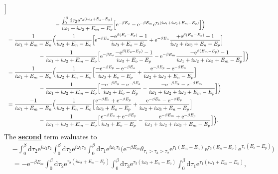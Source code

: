 \documentclass[12pt,a4paper]{scrartcl}
\numberwithin{equation}{section}
\renewcommand{\exp}[1]{\mathrm{e}^{#1}}
\begin{document}
\begin{align}
 \Big] \nonumber \\
 & \hspace*{3cm} -  \frac{\int_0^{\beta} \mathrm{d}\tau_3 \exp{\tau_3( i\omega_3 +E_o-E_p) }}{i\omega_1+ i\omega_2 + E_m-E_o}
 \Big[
 \exp{-\beta E_o} - \exp{-\beta E_m}\exp{\tau_3(i\omega_1+ i\omega_2 + E_m-E_o) }
 \Big]
 \Big)  \\
  &= 
 \frac{1}{i\omega_1 +E_m-E_n}
 \Big( \frac{1}{i\omega_2 +E_n-E_o}
 \Big[
 \exp{-\beta E_o}\frac{-\exp{\beta(E_o-E_p)}-1 }{i\omega_3 +E_o-E_p} 
  + \exp{-\beta E_n}\frac{ +\exp{\beta(E_n- E_p)} -1 }{ i\omega_2 + i\omega_3 + E_n- E_p } 
 \Big] \nonumber \\
 & \hspace*{2cm} -  \frac{1}{i\omega_1+ i\omega_2 + E_m-E_o}
 \Big[
 \exp{-\beta E_o} \frac{-\exp{\beta(E_o-E_p)}-1 }{i\omega_3 +E_o-E_p} 
 - \exp{-\beta E_m} \frac{ -\exp{\beta(E_m- E_p)} -1 }{ i\omega_1 + i\omega_2 + i\omega_3 + E_m- E_p } 
 \Big]
 \Big)  \\
  &= 
 \frac{1}{i\omega_1 +E_m-E_n}
 \Big( \frac{1}{i\omega_2 +E_n-E_o}
 \Big[
 \frac{-\exp{-\beta E_p}-\exp{-\beta E_o} }{i\omega_3 +E_o-E_p} 
  + \frac{ \exp{-\beta E_p} -\exp{-\beta E_n}}{ i\omega_2 + i\omega_3 + E_n- E_p } 
 \Big] \nonumber \\
 & \hspace*{2cm} -  \frac{1}{i\omega_1+ i\omega_2 + E_m-E_o}
 \Big[
  \frac{-\exp{-\beta E_p}-\exp{-\beta E_o} }{i\omega_3 +E_o-E_p} 
 -  \frac{ -\exp{-\beta E_p} -\exp{-\beta E_m} }{ i\omega_1 + i\omega_2 + i\omega_3 + E_m- E_p } 
 \Big]
 \Big)  \\
   &= 
 \frac{-1}{i\omega_1 +E_m-E_n}
 \Big( \frac{1}{i\omega_2 +E_n-E_o}
 \Big[
 \frac{\exp{-\beta E_o}+\exp{-\beta E_p} }{i\omega_3 +E_o-E_p} 
  + \frac{ \exp{-\beta E_n} - \exp{-\beta E_p} }{ i\omega_2 + i\omega_3 + E_n- E_p } 
 \Big] \nonumber \\
 & \hspace*{2cm} -  \frac{1}{i\omega_1+ i\omega_2 + E_m-E_o}
 \Big[
  \frac{\exp{-\beta E_o}+\exp{-\beta E_p} }{i\omega_3 +E_o-E_p} 
 -  \frac{ \exp{-\beta E_m}+\exp{-\beta E_p} }{ i\omega_1 + i\omega_2 + i\omega_3 + E_m- E_p } 
 \Big]
 \Big)  .
\end{align}
The \textbf{\underline{second}} term evaluates to
\begin{align}
 &-\int_0^{\beta} \mathrm{d}\tau_2 \exp{i\omega_2 \tau_2} 
 \int_0^{\beta} \mathrm{d}\tau_3 \exp{i\omega_3 \tau_3}
 \int_0^{\beta} \mathrm{d}\tau_1 \exp{i\omega_1 \tau_1}
 \Big( \exp{-\beta E_m}\theta_{\tau_1 > \tau_3 > \tau_2} \exp{\tau_1(E_m-E_n)}\exp{\tau_3(E_n-E_o)}\exp{\tau_2(E_o-E_p)} \Big) \\
 &= -\exp{-\beta E_m}
 \int_0^{\beta} \mathrm{d}\tau_2 \exp{\tau_2( i\omega_2 +E_o-E_p)} 
 \int_0^{\beta} \mathrm{d}\tau_3 \exp{\tau_3( i\omega_3 +E_n-E_o)}
 \int_0^{\beta} \mathrm{d}\tau_1 \exp{\tau_1( i\omega_1 +E_m-E_n)},
\end{align}
\end{document}
